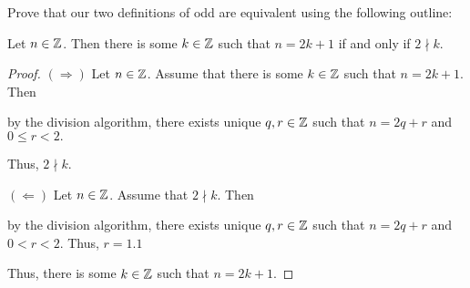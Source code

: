 \documentclass[handout,nooutcomes]{ximera}
\begin{document}
\begin{br}
    Prove that our two definitions of odd are equivalent using the following outline:
        \begin{proposition}
        Let $n\in\mathbb Z$. Then there is some $k\in\mathbb Z$ such that $n=2k+1$ if and only if $2\nmid k$.

        \begin{proof}
            $(\Rightarrow)$  Let $n\in\mathbb Z$. Assume that there is some $k\in\mathbb Z$ such that $n=2k+1$. Then 
            \begin{shortAnswer}[\vspace{3cm}]
                by the division algorithm, there exists unique $q,r\in\mathbb Z$ such that $n=2q+r$ and $0\leq r <2.$
            \end{shortAnswer}
            Thus, $2\nmid k$.

            $(\Leftarrow)$  Let $n\in\mathbb Z$. Assume that $2\nmid k$. Then
            \begin{shortAnswer}[\vspace{3cm}]
                by the division algorithm, there exists unique $q,r\in\mathbb Z$ such that $n=2q+r$ and $0< r <2.$ Thus, $r=1.1$ 
            \end{shortAnswer}
            Thus, there is some $k\in\mathbb Z$ such that $n=2k+1$.
        \end{proof}
    \end{proposition}
\end{br}
\end{document}
